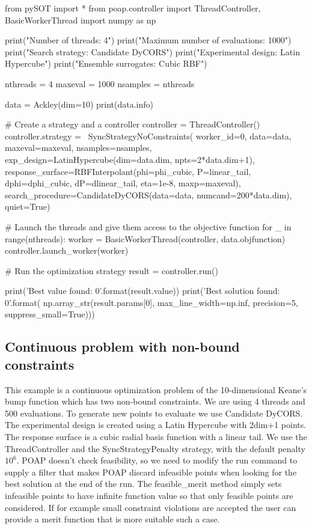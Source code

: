 \documentclass[]{article}
\begin{document}
\begin{python}
from pySOT import *
from poap.controller import ThreadController, BasicWorkerThread
import numpy as np

print("Number of threads: 4")
print("Maximum number of evaluations: 1000")
print("Search strategy: Candidate DyCORS")
print("Experimental design: Latin Hypercube")
print("Ensemble surrogates: Cubic RBF")

nthreads = 4
maxeval = 1000
nsamples = nthreads

data = Ackley(dim=10)
print(data.info)

# Create a strategy and a controller
controller = ThreadController()
controller.strategy = \
    SyncStrategyNoConstraints(
        worker_id=0, data=data,
        maxeval=maxeval, nsamples=nsamples,
        exp_design=LatinHypercube(dim=data.dim, npts=2*data.dim+1),
        response_surface=RBFInterpolant(phi=phi_cubic, P=linear_tail,
                                        dphi=dphi_cubic, dP=dlinear_tail,
                                        eta=1e-8, maxp=maxeval),
        search_procedure=CandidateDyCORS(data=data, numcand=200*data.dim),
        quiet=True)

# Launch the threads and give them access to the objective function
for _ in range(nthreads):
    worker = BasicWorkerThread(controller, data.objfunction)
    controller.launch_worker(worker)

# Run the optimization strategy
result = controller.run()

print('Best value found: {0}'.format(result.value))
print('Best solution found: {0}'.format(
    np.array_str(result.params[0], max_line_width=np.inf,
                 precision=5, suppress_small=True)))
\end{python}

\subsection{Continuous problem with non-bound constraints}
This example is a continuous optimization problem of the 10-dimensional Keane's bump function which has two non-bound constraints. We are using 4 threads and 500 evaluations. To generate new points to evaluate we use Candidate DyCORS. The experimental design is created using a Latin Hypercube with 2dim+1 points. The response surface is a cubic radial basis function with a linear tail. We use the ThreadController and the SyncStrategyPenalty strategy, with the default penalty $10^6$. POAP doesn't check feasibility, so we need to modify the run command to supply a filter that makes POAP discard infeasible points when looking for the best solution at the end of the run. The feasible\_merit method simply sets infeasible points to have infinite function value so that only feasible points are considered. If for example small constraint violations are accepted the user can provide a merit function that is more suitable such a case.
\end{document}
